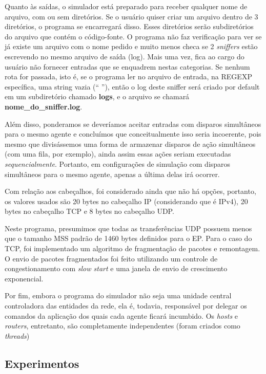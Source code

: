 \documentclass[11pt]{article}
\begin{document}
Quanto às saídas, o simulador está preparado para receber qualquer nome de arquivo, com ou sem diretórios. Se o usuário quiser criar um arquivo dentro de 3 diretórios, o programa se encarregará disso. Esses diretórios serão subdiretórios do arquivo que contém o código-fonte. O programa não faz verificação para ver se já existe um arquivo com o nome pedido e muito menos checa se 2 \textit{sniffers} estão escrevendo no mesmo arquivo de saída (log). Mais uma vez, fica ao cargo do usuário não fornecer entradas que se enquadrem nestas categorias. Se nenhum rota for passada, isto é, se o programa ler no arquivo de entrada, na REGEXP específica, uma string vazia (`` ''), então o log deste sniffer será criado por default em um subdiretório chamado \textbf{logs}, e o arquivo se chamará \textbf{nome\_do\_sniffer.log}.

Além disso, ponderamos se deveríamos aceitar entradas com disparos simultâneos para o mesmo agente e concluímos que conceitualmente isso seria incoerente, pois mesmo que divisássemos uma forma de armazenar disparos de ação simultâneos (com uma fila, por exemplo), ainda assim essas ações seriam executadas \textit{sequencialmente}. Portanto, em configurações de simulação com disparos simultâneos para o mesmo agente, apenas a última delas irá ocorrer.

Com relação aos cabeçalhos, foi considerado ainda que não há opções, portanto, os valores usados são 20 bytes no cabeçalho IP (considerando que é IPv4), 20 bytes no cabeçalho TCP e 8 bytes no cabeçalho UDP.

Neste programa, presumimos que todas as transferências UDP possuem menos que o tamanho MSS padrão de 1460 bytes definidos para o EP. Para o caso do TCP, foi implementado um algoritmo de fragmentação de pacotes e remontagem. O envio de pacotes fragmentados foi feito utilizando um controle de congestionamento com \textit{slow start} e uma janela de envio de crescimento exponencial.

Por fim, embora o programa do simulador não seja uma unidade central controladora das entidades da rede, ela é, todavia, responsável por delegar os comandos da aplicação dos quais cada agente ficará incumbido. Os \textit{hosts} e \textit{routers}, entretanto, são completamente independentes (foram criados como \textit{threads})

\subsection{Experimentos}
\end{document}
